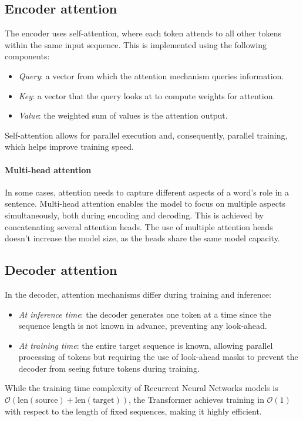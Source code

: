 \subsection{Encoder attention}
The encoder uses self-attention, where each token attends to all other tokens within the same input sequence. 
This is implemented using the following components:
\begin{itemize}
    \item \textit{Query}: a vector from which the attention mechanism queries information.
    \item \textit{Key}: a vector that the query looks at to compute weights for attention.
    \item \textit{Value}: the weighted sum of values is the attention output.
\end{itemize}
Self-attention allows for parallel execution and, consequently, parallel training, which helps improve training speed.

\paragraph*{Multi-head attention}
In some cases, attention needs to capture different aspects of a word's role in a sentence.
Multi-head attention enables the model to focus on multiple aspects simultaneously, both during encoding and decoding. 
This is achieved by concatenating several attention heads.
The use of multiple attention heads doesn't increase the model size, as the heads share the same model capacity.

\subsection{Decoder attention}
In the decoder, attention mechanisms differ during training and inference:
\begin{itemize}
    \item \textit{At inference time}: the decoder generates one token at a time since the sequence length is not known in advance, preventing any look-ahead.
    \item \textit{At training time}: the entire target sequence is known, allowing parallel processing of tokens but requiring the use of look-ahead masks to prevent the decoder from seeing future tokens during training.
\end{itemize}
While the training time complexity of Recurrent Neural Networks models is $\mathcal{O}(\text{len}(\text{source})+\text{len}(\text{target}))$, the Transformer achieves training in $\mathcal{O}(1)$ with respect to the length of fixed sequences, making it highly efficient.

